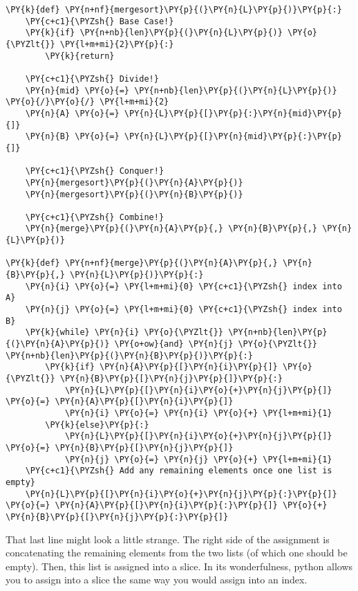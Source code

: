 \begin{Verbatim}[commandchars=\\\{\}]
\PY{k}{def} \PY{n+nf}{mergesort}\PY{p}{(}\PY{n}{L}\PY{p}{)}\PY{p}{:}
    \PY{c+c1}{\PYZsh{} Base Case!}
    \PY{k}{if} \PY{n+nb}{len}\PY{p}{(}\PY{n}{L}\PY{p}{)} \PY{o}{\PYZlt{}} \PY{l+m+mi}{2}\PY{p}{:}
        \PY{k}{return}

    \PY{c+c1}{\PYZsh{} Divide!}
    \PY{n}{mid} \PY{o}{=} \PY{n+nb}{len}\PY{p}{(}\PY{n}{L}\PY{p}{)} \PY{o}{/}\PY{o}{/} \PY{l+m+mi}{2}
    \PY{n}{A} \PY{o}{=} \PY{n}{L}\PY{p}{[}\PY{p}{:}\PY{n}{mid}\PY{p}{]}
    \PY{n}{B} \PY{o}{=} \PY{n}{L}\PY{p}{[}\PY{n}{mid}\PY{p}{:}\PY{p}{]}

    \PY{c+c1}{\PYZsh{} Conquer!}
    \PY{n}{mergesort}\PY{p}{(}\PY{n}{A}\PY{p}{)}
    \PY{n}{mergesort}\PY{p}{(}\PY{n}{B}\PY{p}{)}

    \PY{c+c1}{\PYZsh{} Combine!}
    \PY{n}{merge}\PY{p}{(}\PY{n}{A}\PY{p}{,} \PY{n}{B}\PY{p}{,} \PY{n}{L}\PY{p}{)}

\PY{k}{def} \PY{n+nf}{merge}\PY{p}{(}\PY{n}{A}\PY{p}{,} \PY{n}{B}\PY{p}{,} \PY{n}{L}\PY{p}{)}\PY{p}{:}   
    \PY{n}{i} \PY{o}{=} \PY{l+m+mi}{0} \PY{c+c1}{\PYZsh{} index into A}
    \PY{n}{j} \PY{o}{=} \PY{l+m+mi}{0} \PY{c+c1}{\PYZsh{} index into B}
    \PY{k}{while} \PY{n}{i} \PY{o}{\PYZlt{}} \PY{n+nb}{len}\PY{p}{(}\PY{n}{A}\PY{p}{)} \PY{o+ow}{and} \PY{n}{j} \PY{o}{\PYZlt{}} \PY{n+nb}{len}\PY{p}{(}\PY{n}{B}\PY{p}{)}\PY{p}{:}
        \PY{k}{if} \PY{n}{A}\PY{p}{[}\PY{n}{i}\PY{p}{]} \PY{o}{\PYZlt{}} \PY{n}{B}\PY{p}{[}\PY{n}{j}\PY{p}{]}\PY{p}{:}
            \PY{n}{L}\PY{p}{[}\PY{n}{i}\PY{o}{+}\PY{n}{j}\PY{p}{]} \PY{o}{=} \PY{n}{A}\PY{p}{[}\PY{n}{i}\PY{p}{]}
            \PY{n}{i} \PY{o}{=} \PY{n}{i} \PY{o}{+} \PY{l+m+mi}{1}
        \PY{k}{else}\PY{p}{:}
            \PY{n}{L}\PY{p}{[}\PY{n}{i}\PY{o}{+}\PY{n}{j}\PY{p}{]} \PY{o}{=} \PY{n}{B}\PY{p}{[}\PY{n}{j}\PY{p}{]}
            \PY{n}{j} \PY{o}{=} \PY{n}{j} \PY{o}{+} \PY{l+m+mi}{1}
    \PY{c+c1}{\PYZsh{} Add any remaining elements once one list is empty}
    \PY{n}{L}\PY{p}{[}\PY{n}{i}\PY{o}{+}\PY{n}{j}\PY{p}{:}\PY{p}{]} \PY{o}{=} \PY{n}{A}\PY{p}{[}\PY{n}{i}\PY{p}{:}\PY{p}{]} \PY{o}{+} \PY{n}{B}\PY{p}{[}\PY{n}{j}\PY{p}{:}\PY{p}{]}
\end{Verbatim}



That last line might look a little strange.
The right side of the assignment is concatenating the remaining elements from the two lists (of which one should be empty).
Then, this list is assigned into a slice.
In its wonderfulness, python allows you to assign into a slice the same way you would assign into an index.


